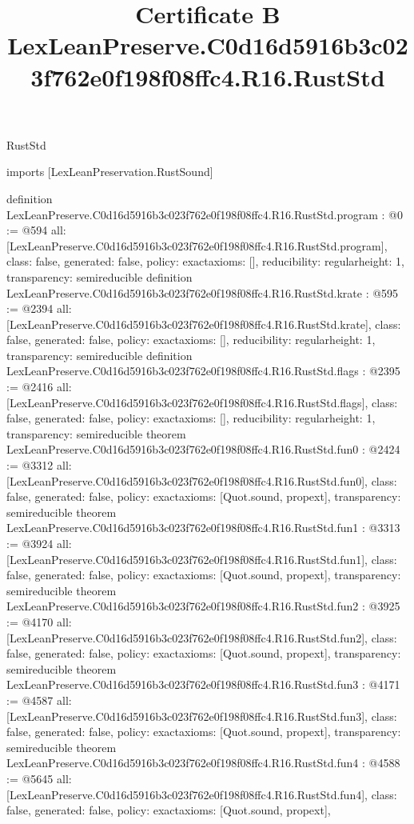 \begin{lexlean}{RustStd}
\title{Certificate B LexLeanPreserve.C0d16d5916b3c023f762e0f198f08ffc4.R16.RustStd}
\begin{coremodule}
imports [LexLeanPreservation.RustSound]

definition LexLeanPreserve.C0d16d5916b3c023f762e0f198f08ffc4.R16.RustStd.program : @0 := @594 {
  all: [LexLeanPreserve.C0d16d5916b3c023f762e0f198f08ffc4.R16.RustStd.program],
  class: false,
  generated: false,
  policy: exact{axioms: []},
  reducibility: regular{height: 1},
  transparency: semireducible
}
definition LexLeanPreserve.C0d16d5916b3c023f762e0f198f08ffc4.R16.RustStd.krate : @595 := @2394 {
  all: [LexLeanPreserve.C0d16d5916b3c023f762e0f198f08ffc4.R16.RustStd.krate],
  class: false,
  generated: false,
  policy: exact{axioms: []},
  reducibility: regular{height: 1},
  transparency: semireducible
}
definition LexLeanPreserve.C0d16d5916b3c023f762e0f198f08ffc4.R16.RustStd.flags : @2395 := @2416 {
  all: [LexLeanPreserve.C0d16d5916b3c023f762e0f198f08ffc4.R16.RustStd.flags],
  class: false,
  generated: false,
  policy: exact{axioms: []},
  reducibility: regular{height: 1},
  transparency: semireducible
}
theorem LexLeanPreserve.C0d16d5916b3c023f762e0f198f08ffc4.R16.RustStd.fun0 : @2424 := @3312 {
  all: [LexLeanPreserve.C0d16d5916b3c023f762e0f198f08ffc4.R16.RustStd.fun0],
  class: false,
  generated: false,
  policy: exact{axioms: [Quot.sound, propext]},
  transparency: semireducible
}
theorem LexLeanPreserve.C0d16d5916b3c023f762e0f198f08ffc4.R16.RustStd.fun1 : @3313 := @3924 {
  all: [LexLeanPreserve.C0d16d5916b3c023f762e0f198f08ffc4.R16.RustStd.fun1],
  class: false,
  generated: false,
  policy: exact{axioms: [Quot.sound, propext]},
  transparency: semireducible
}
theorem LexLeanPreserve.C0d16d5916b3c023f762e0f198f08ffc4.R16.RustStd.fun2 : @3925 := @4170 {
  all: [LexLeanPreserve.C0d16d5916b3c023f762e0f198f08ffc4.R16.RustStd.fun2],
  class: false,
  generated: false,
  policy: exact{axioms: [Quot.sound, propext]},
  transparency: semireducible
}
theorem LexLeanPreserve.C0d16d5916b3c023f762e0f198f08ffc4.R16.RustStd.fun3 : @4171 := @4587 {
  all: [LexLeanPreserve.C0d16d5916b3c023f762e0f198f08ffc4.R16.RustStd.fun3],
  class: false,
  generated: false,
  policy: exact{axioms: [Quot.sound, propext]},
  transparency: semireducible
}
theorem LexLeanPreserve.C0d16d5916b3c023f762e0f198f08ffc4.R16.RustStd.fun4 : @4588 := @5645 {
  all: [LexLeanPreserve.C0d16d5916b3c023f762e0f198f08ffc4.R16.RustStd.fun4],
  class: false,
  generated: false,
  policy: exact{axioms: [Quot.sound, propext]},
}
\end{coremodule}
\end{lexlean}
